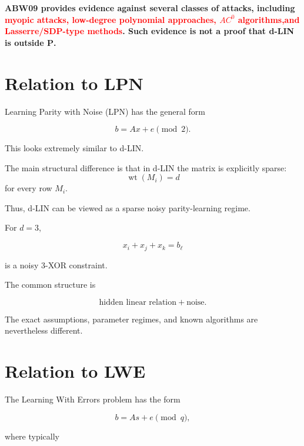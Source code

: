 \documentclass[11pt,a4paper]{article}
\newcommand{\wt}{\operatorname{wt}}
\begin{document}
\textbf{ABW09 provides evidence against several classes of attacks, including \textcolor{red}{myopic attacks, low-degree polynomial approaches, $AC^0$ algorithms,and Lasserre/SDP-type methods}. Such evidence is not a proof that
d-LIN is outside $\mathbf P$.}

\section{Relation to LPN}

Learning Parity with Noise (LPN) has the general form

\begin{equation}
    b=Ax+e
    \pmod 2.
\end{equation}

This looks extremely similar to d-LIN.

The main structural difference is that in d-LIN the matrix is
explicitly sparse:\begin{equation}
    \wt(M_i)=d
\end{equation} for every row $M_i$.

Thus, d-LIN can be viewed as a sparse noisy parity-learning regime.

For $d=3$,

\begin{equation}
    x_i+x_j+x_k=b_\ell
\end{equation}

is a noisy 3-XOR constraint.

The common structure is

\begin{equation}
    \boxed{\text{hidden linear relation}+\text{noise}.}
\end{equation}

The exact assumptions, parameter regimes, and known algorithms are
nevertheless different.

\section{Relation to LWE}

The Learning With Errors problem has the form

\begin{equation}
    b=As+e\pmod q,
\end{equation}

where typically
\end{document}
